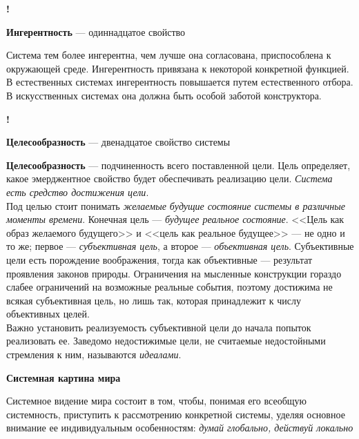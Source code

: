 \documentclass{article}
\newcommand{\note}[1]{\textit{#1}}
\renewcommand{\subsection}[1]{
	\vspace{2em}
	\begin{flushright}
		\large
		\textbf{#1}
	\end{flushright}
	}
\newcommand{\define}[2]{
	\textbf{#1} --- #2
	}
\newcommand{\marked}[2]{
	\begin{flushright}\textbf{!}\hspace{2ex}\vline\hspace{2ex}
		\begin{minipage}{0.9\textwidth}
			\define{#1}{#2}
		\end{minipage}
	\end{flushright}
	}
\begin{document}
\marked{Ингерентность}{одиннадцатое свойство}
Система тем более ингерентна, чем лучше она согласована, приспособлена к окружающей среде. Ингерентность привязана к некоторой конкретной функцией.\\
В естественных системах ингерентность повышается путем естественного отбора. В искусственных системах она должна быть особой заботой конструктора.
\marked{Целесообразность}{двенадцатое свойство системы}
\define{Целесообразность}{подчиненность всего поставленной цели.}Цель определяет, какое эмерджентное свойство будет обеспечивать реализацию цели. \note{Система есть средство достижения цели}.\\
Под целью стоит понимать \note{желаемые будущие состояние системы в различные моменты времени}. Конечная цель --- \note{будущее реальное состояние}. <<Цель как образ желаемого будущего>> и <<цель как реальное будущее>> --- не одно и то же; первое --- \note{субъективная цель}, а второе --- \note{объективная цель}. Субъективные цели есть порождение воображения, тогда как объективные --- результат проявления законов природы.  Ограничения на мысленные конструкции гораздо слабее ограничений на возможные реальные события, поэтому достижима не всякая субъективная цель, но лишь так, которая принадлежит к числу объективных целей.\\
Важно установить реализуемость субъективной цели до начала попыток реализовать ее. Заведомо недостижимые цели, не считаемые недостойными стремления к ним, называются \note{идеалами}.
\subsection{Системная картина мира}
Системное видение мира состоит в том, чтобы, понимая его всеобщую системность, приступить к рассмотрению конкретной системы, уделяя основное внимание ее индивидуальным особенностям: \note{думай глобально, действуй локально}
\end{document}
